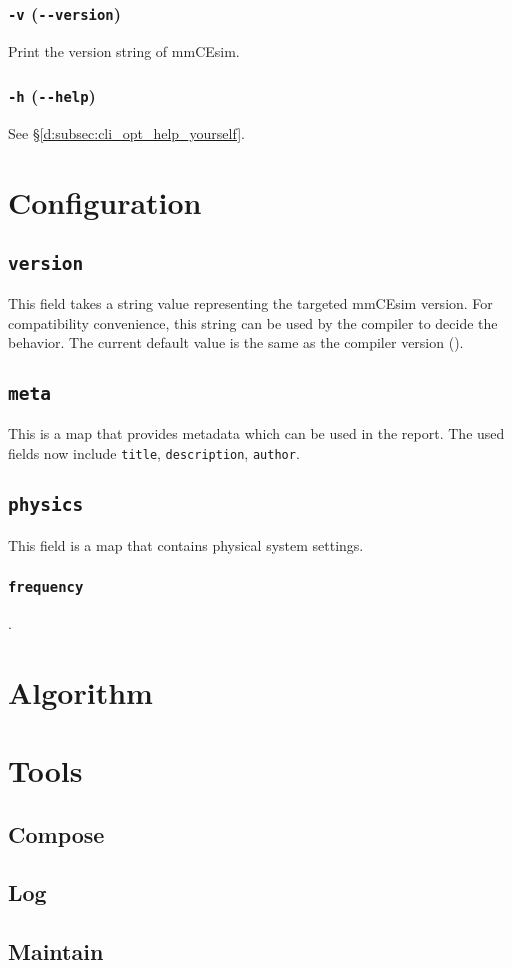 \subsubsection{\texttt{-v} (\texttt{-{}-version})}
Print the version string of mmCEsim.

\subsubsection{\texttt{-h} (\texttt{-{}-help})}
See \S\ref{d:subsec:cli_opt_help_yourself}.

\section{Configuration}

\subsection{\texttt{version}}
This field takes a string value representing the targeted mmCEsim version.
For compatibility convenience, this string can be used by the compiler
to decide the behavior.
The current default value is the same as the compiler version (\texttt{\mmCEsimVersion}).

\subsection{\texttt{meta}}
This is a map that provides metadata which can be used in the report.
The used fields now include
\texttt{title},
\texttt{description},
\texttt{author}.

\subsection{\texttt{physics}}
This field is a map that contains physical system settings.

\subsubsection{\texttt{frequency}}.


\section{Algorithm}

\section{Tools}

\subsection{Compose}

\subsection{Log}

\subsection{Maintain}
